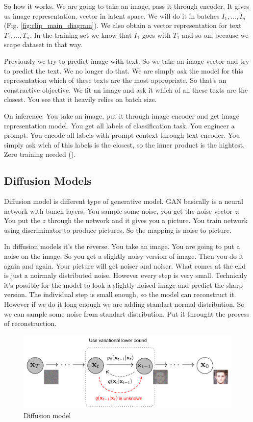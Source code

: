 So how it works. We are going to take an image, pass it through encoder.
It gives us image representation, vector in latent space. We will do it in batches $I_1, ..., I_n$ (Fig. \ref{fig:clip_main_diagram}).
We also obtain a vector representation for text $T_1, ..., T_n$.
In the training set we know that $I_1$ goes with $T_1$ and so on, because we scape dataset in that way.

Previously we try to predict image with text. So we take an image vector and try to predict the text.
We no longer do that. We are simply ask the model for this representation which of these texts are the most appropriate.
So that's an constractive objective. We fit an image and ask it which of all these texts are the closest.
You see that it heavily relies on batch size.

On inference. You take an image, put it through image encoder and get image representation model.
You get all labels of classification task. You engineer a prompt. You encode all labels with prompt context through text encoder.
You simply ask wich of this labels is the closest, so the inner product is the hightest.
Zero training needed  (\cite{radford2021learning}).
\subsection{Diffusion Models}
Diffusion model is different type of generative model.
GAN basically is a neural network with bunch layers. You sample some noise, you get the noise vector $z$.
You put the $z$ through the network and it gives you a picture. You train network using discriminator to produce pictures.
So the mapping is noise to picture.

In diffusion models it's the reverse. You take an image. You are going to put a noise on the image.
So you get a slightly noisy version of image. Then you do it again and again.
Your picture will get noiser and noiser. What comes at the end is just a noirmaly distributed noise.
However every step is very small. Technicaly it's possible for the model to look a slightly noised image and predict the sharp version.
The individual step is small enough, so the model can reconstruct it.
However if we do it long enough we are adding standart normal distribution.
So we can sample some noise from standart distribution. Put it throught the process of reconstruction.

\begin{figure}[h]
    \centering
    \includegraphics[width=1\textwidth]{images/ddpm.png}
    \caption{Diffusion model}
    \label{fig:ddpm}
\end{figure}

